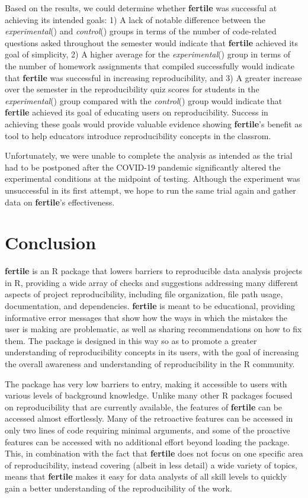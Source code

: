 \documentclass[APA,LATO1COL]{WileyNJD-v2}\usepackage[]{graphicx}\usepackage[]{color}
\newcommand{\R}{\textsf{R}\xspace}
\newcommand{\pkg}[1]{\textbf{#1}}
\newcommand{\func}[1]{\textit{#1}()}
\begin{document}
Based on the results, we could determine whether \pkg{fertile} was successful at achieving its intended goals: 1) A lack of notable difference between the \func{experimental} and \func{control} groups in terms of the number of code-related questions asked throughout the semester would indicate that \pkg{fertile} achieved its goal of simplicity, 2) A higher average for the \func{experimental} group in terms of the number of homework assignments that compiled successfully would indicate that \pkg{fertile} was successful in increasing reproducibility, and 3) A greater increase over the semester in the reproducibility quiz scores for students in the \func{experimental} group compared with the \func{control} group would indicate that \pkg{fertile} achieved its goal of educating users on reproducibility. Success in achieving these goals would provide valuable evidence showing \pkg{fertile}'s benefit as tool to help educators introduce reproducibility concepts in the classrom.

 Unfortunately, we were unable to complete the analysis as intended as the trial had to be postponed after the COVID-19 pandemic significantly altered the experimental conditions at the midpoint of testing. Although the experiment was unsuccessful in its first attempt, we hope to run the same trial again and gather data on \pkg{fertile}'s effectiveness. 



\section{Conclusion}\label{sec:conclusion}


\pkg{fertile} is an \R package that lowers barriers to reproducible data analysis projects in \R, providing a wide array of checks and suggestions addressing many different aspects of project reproducibility, including file organization, file path usage, documentation, and dependencies.
\pkg{fertile} is meant to be educational, providing informative error messages that show how the ways in which the mistakes the user is making are problematic, as well as sharing recommendations on how to fix them. The package is designed in this way so as to promote a greater understanding of reproducibility concepts in its users, with the goal of increasing the overall awareness and understanding of reproducibility in the \R community.

The package has very low barriers to entry, making it accessible to users with various levels of background knowledge. Unlike many other \R packages focused on reproducibility that are currently available, the features of \pkg{fertile} can be accessed almost effortlessly. Many of the retroactive features can be accessed in only two lines of code requiring minimal arguments, and some of the proactive features can be accessed with no additional effort beyond loading the package. This, in combination with the fact that \pkg{fertile} does not focus on one specific area of reproducibility, instead covering (albeit in less detail) a wide variety of topics, means that \pkg{fertile} makes it easy for data analysts of all skill levels to quickly gain a better understanding of the reproducibility of the work.
\end{document}
